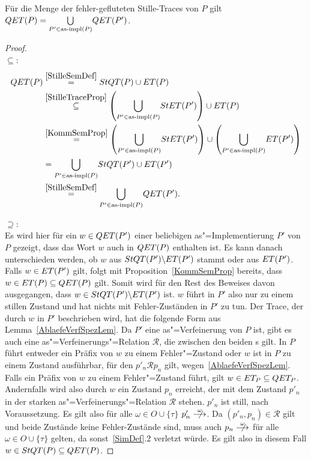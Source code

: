 \vspace{0.2cm}

\begin{Prop}
  \label{StilleSemProp}
  Für die Menge der fehler-gefluteten Stille-Traces von $P$ gilt $QET (P) =
  \underset{P'\in\mathrm{as}\text{-}\mathrm{impl} (P)}{\bigcup} QET (P')$.
\end{Prop}
\begin{proof}\mbox{}\\
  \glqq$\subseteq$\grqq{}:
  {\allowdisplaybreaks
  \begin{align*}
    QET (P)&\overset{\ref{StilleSemDef}}{=} StQT (P) \cup ET (P)\\
    &\overset{\ref{StilleTraceProp}}{\subseteq} \left(\underset{P'\in\mathrm{as}\text{-}\mathrm{impl}
    (P)}{\bigcup} StET (P')\right)\cup ET (P)\\
    &\overset{\ref{KommSemProp}}{=} \left(\underset{P'\in\mathrm{as}\text{-}\mathrm{impl}
    (P)}{\bigcup} StET (P')\right)\cup \left(\underset{P'\in\mathrm{as}\text{-}\mathrm{impl}
    (P)}{\bigcup} ET (P')\right)\\
    &= \underset{P'\in\mathrm{as}\text{-}\mathrm{impl} (P)}{\bigcup} StQT (P') \cup ET (P')\\
    &\overset{\ref{StilleSemDef}}{=} \underset{P'\in\mathrm{as}\text{-}\mathrm{impl} (P)}{\bigcup} QET
    (P').
  \end{align*}}

  \glqq$\supseteq$\grqq{}:\\
  Es wird hier für ein $w\in QET (P')$ einer beliebigen as"=Implementierung
  $P'$ von $P$ gezeigt, dass das Wort $w$ auch in $QET (P)$ enthalten ist. Es
  kann danach unterschieden werden, ob $w$ aus $StQT (P')\backslash ET (P')$
  stammt oder aus $ET (P')$. Falls $w\in ET (P')$ gilt, folgt mit
  Proposition~\ref{KommSemProp} bereits, dass $w\in ET (P) \subseteq QET (P)$
  gilt. Somit wird für den Rest des Beweises davon ausgegangen, dass $w\in StQT
  (P')\backslash ET (P')$ ist. $w$ führt in $P'$ also nur zu einem stillen
  Zustand und hat nichts mit Fehler-Zuständen in $P'$ zu tun. Der Trace, der
  durch $w$ in $P'$ beschrieben wird, hat die folgende Form aus
  Lemma~\ref{AblaefeVerfSpezLem}. Da $P'$ eine as"=Verfeinerung von $P$ ist,
  gibt es auch eine as"=Verfeinerungs"=Relation $\mathcal{R}$, die zwischen den
  beiden \MEIO{}s gilt. In $P$ führt entweder ein Präfix von $w$ zu einem
  Fehler"=Zustand oder $w$ ist in $P$ zu einem Zustand ausführbar, für den
  $p'_n \mathcal{R} p_n$ gilt, wegen~\ref{AblaefeVerfSpezLem}. Falls ein Präfix
  von $w$ zu einem Fehler"=Zustand führt, gilt $w\in ET _P\subseteq QET _P$.
  Andernfalls wird also durch $w$ ein Zustand $p_n$ erreicht, der mit dem
  Zustand $p'_n$ in der starken as"=Verfeinerungs"=Relation $\mathcal{R}$
  stehen. $p'_n$ ist still, nach Voraussetzung. Es gilt also für alle
  $\omega\in O\cup \{\tau\}$ $p'_n\nmust[\omega]$. Da $(p'_n,p_n)
  \in\mathcal{R}$ gilt und beide Zustände keine Fehler-Zustände sind, muss auch
  $p_n\nmust[\omega]$ für alle $\omega\in O\cup \{\tau\}$ gelten, da
  sonst~\ref{SimDef}.2 verletzt würde. Es gilt also in diesem Fall $w\in StQT
  (P)\subseteq QET (P)$.
\end{proof}


